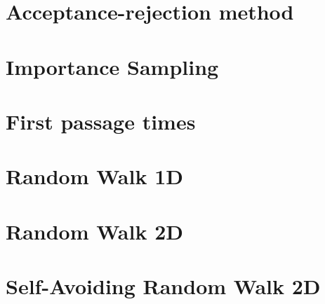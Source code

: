 \section{Acceptance-rejection method}

\section{Importance Sampling}

\section{First passage times}

\section{Random Walk 1D}

\section{Random Walk 2D}

\section{Self-Avoiding Random Walk 2D}







